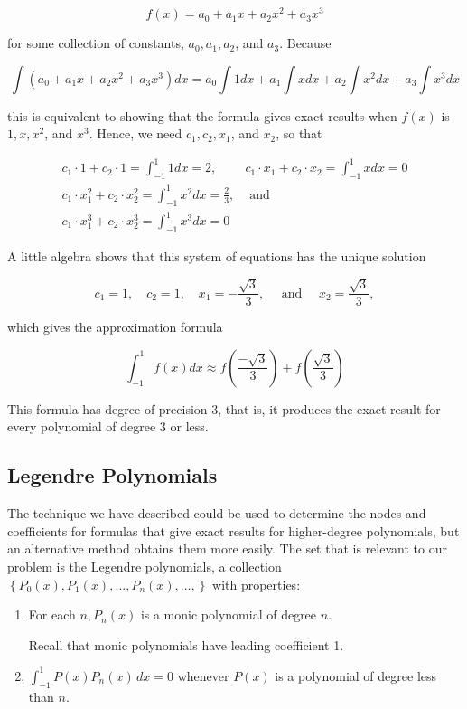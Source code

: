 $$
f(x)=a_{0}+a_{1} x+a_{2} x^{2}+a_{3} x^{3}
$$

for some collection of constants, $a_{0}, a_{1}, a_{2}$, and $a_{3}$. Because

$$
\int\left(a_{0}+a_{1} x+a_{2} x^{2}+a_{3} x^{3}\right) d x=a_{0} \int 1 d x+a_{1} \int x d x+a_{2} \int x^{2} d x+a_{3} \int x^{3} d x
$$

this is equivalent to showing that the formula gives exact results when $f(x)$ is $1, x, x^{2}$, and $x^{3}$. Hence, we need $c_{1}, c_{2}, x_{1}$, and $x_{2}$, so that

$$
\begin{array}{cc}
c_{1} \cdot 1+c_{2} \cdot 1=\int_{-1}^{1} 1 d x=2, & c_{1} \cdot x_{1}+c_{2} \cdot x_{2}=\int_{-1}^{1} x d x=0 \\
c_{1} \cdot x_{1}^{2}+c_{2} \cdot x_{2}^{2}=\int_{-1}^{1} x^{2} d x=\frac{2}{3}, & \text { and } \\
c_{1} \cdot x_{1}^{3}+c_{2} \cdot x_{2}^{3}=\int_{-1}^{1} x^{3} d x=0
\end{array}
$$

A little algebra shows that this system of equations has the unique solution

$$
c_{1}=1, \quad c_{2}=1, \quad x_{1}=-\frac{\sqrt{3}}{3}, \quad \text { and } \quad x_{2}=\frac{\sqrt{3}}{3},
$$

which gives the approximation formula


\begin{equation}\label{eqngaussquad1}
\int_{-1}^{1} f(x) d x \approx f\left(\frac{-\sqrt{3}}{3}\right)+f\left(\frac{\sqrt{3}}{3}\right) \tag{4.40}
\end{equation}


This formula has degree of precision 3, that is, it produces the exact result for every polynomial of degree 3 or less.

\subsection*{Legendre Polynomials}
The technique we have described could be used to determine the nodes and coefficients for formulas that give exact results for higher-degree polynomials, but an alternative method obtains them more easily. The set that is relevant to our problem is the Legendre polynomials, a collection $\left\{P_{0}(x), P_{1}(x), \ldots, P_{n}(x), \ldots,\right\}$ with properties:\\
\begin{enumerate}[label=(\arabic*)]
\item For each $n, P_{n}(x)$ is a monic polynomial of degree $n$.

Recall that monic polynomials have leading coefficient 1.

\item $\displaystyle\int_{-1}^1P(x)P_n(x)\,dx=0$ whenever $P(x)$ is a polynomial of degree less than $n$.
\end{enumerate}


